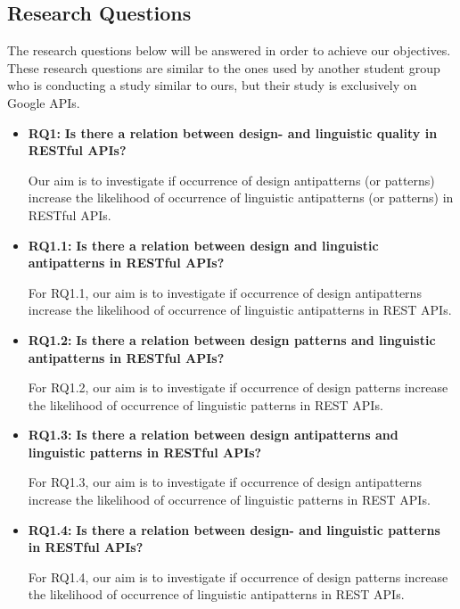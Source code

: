 \subsection{Research Questions} \label{research_questions}
The research questions below will be answered in order to achieve our objectives. These research questions are similar to the ones used by another student group who is conducting a study similar to ours, but their study is exclusively on Google APIs. 

\begin{itemize}
\item \textbf{RQ1:} \textbf{Is there a relation between design- and linguistic quality in RESTful APIs?}

Our aim is to investigate if occurrence of design antipatterns (or patterns) increase the likelihood of occurrence of linguistic antipatterns (or patterns) in RESTful APIs.


\item \textbf{RQ1.1:} \textbf{Is there a relation between design and linguistic antipatterns in RESTful APIs?}

For RQ1.1, our aim is to investigate if occurrence of design antipatterns increase the likelihood of occurrence of linguistic antipatterns in REST APIs.

\item \textbf{RQ1.2:} \textbf{Is there a relation between design patterns and linguistic antipatterns in RESTful APIs?}

For RQ1.2, our aim is to investigate if occurrence of design patterns increase the likelihood of occurrence of linguistic patterns in REST APIs. 

\item  \textbf{RQ1.3:} \textbf{Is there a relation between design antipatterns and linguistic patterns in RESTful APIs?}

For RQ1.3, our aim is to investigate if occurrence of design antipatterns increase the likelihood of occurrence of linguistic patterns in REST APIs.

\item  \textbf{RQ1.4:} \textbf{Is there a relation between design- and linguistic patterns in RESTful APIs?}

For RQ1.4, our aim is to investigate if occurrence of design patterns increase the likelihood of occurrence of linguistic antipatterns in REST APIs. 

\end{itemize}

